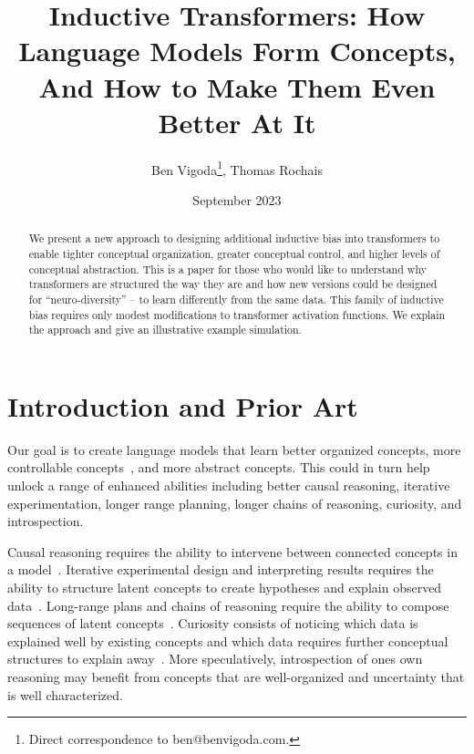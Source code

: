 \documentclass{article}
\title{Inductive Transformers: How Language Models Form Concepts, And How to Make Them Even Better At It}
\author{Ben Vigoda\thanks{Direct correspondence to ben@benvigoda.com.}\hspace{0.5em},  Thomas Rochais}
\date{September 2023}
\begin{document}
\maketitle


\begin{abstract}
We present a new approach to designing additional inductive bias into transformers to enable tighter conceptual organization, greater conceptual control, and higher levels of conceptual abstraction. This is a paper for those who would like to understand why transformers are structured the way they are and how new versions could be designed for ``neuro-diversity'' -- to learn differently from the same data.  This family of inductive bias requires only modest modifications to transformer activation functions. We explain the approach and give an illustrative example simulation.
\end{abstract}


\section{Introduction and Prior Art}

Our goal is to create language models that learn better organized concepts, more controllable concepts~\citep{wang2023easyedit, meng2023massediting, hernandez2023inspecting}, and more abstract concepts. This could in turn help unlock a range of enhanced abilities including better causal reasoning, iterative experimentation, longer range planning, longer chains of reasoning, curiosity, and introspection.

Causal reasoning requires the ability to intervene between connected concepts in a model~\citep{pearl1995causal}. Iterative experimental design and interpreting results requires the ability to structure latent concepts to create hypotheses and explain observed data~\citep{lu2022unified}.  Long-range plans and chains of reasoning require the ability to compose sequences of latent concepts~\citep{lake2017building, oh2017zero, shinn2023reflexion}. Curiosity consists of noticing which data is explained well by existing concepts and which data requires further conceptual structures to explain away~\citep{mazzaglia2022curiosity, chen2022redeeming, pearl1988probabilistic, peterson2019embracing}.  More speculatively, introspection of ones own reasoning may benefit from concepts that are well-organized and uncertainty that is well characterized.
\end{document}
